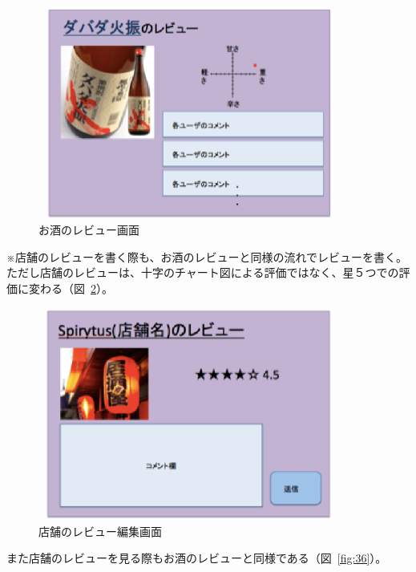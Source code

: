\documentclass[a4j,titlepage]{jarticle}
\begin{document}
\begin {figure}[!htbp]
    \begin{center}
    \includegraphics [height=7cm, width=10cm]{34.eps}
    \caption {お酒のレビュー画面}
    \label {fig:34}
    \end{center}
\end {figure}



※店舗のレビューを書く際も、お酒のレビューと同様の流れでレビューを書く。
ただし店舗のレビューは、十字のチャート図による評価ではなく、星５つでの評価に変わる（図~\ref{fig:35}）。



\begin {figure}[!htbp]
    \begin{center}
    \includegraphics [height=7cm, width=10cm]{35.eps}
    \caption {店舗のレビュー編集画面}
    \label {fig:35}
    \end{center}
\end {figure}

\clearpage

また店舗のレビューを見る際もお酒のレビューと同様である（図~\ref{fig:36}）。
\end{document}
